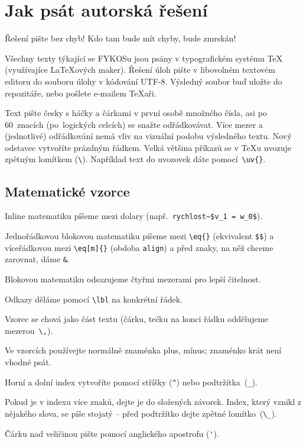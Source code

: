 \documentclass[fykos]{fksbase} %
\begin{document}
\section{Jak psát autorská řešení}

Řešení pište bez chyb! Kdo tam bude mít chyby, bude zmrskán!

Všechny texty týkající se FYKOSu jsou psány v typografickém systému \TeX
(využívajíce {\LaTeX}ových maker). Řešení úloh pište v libovolném
textovém editoru do souboru úlohy v kódování UTF-8. Výsledný soubor buď uložte
do repozitáře, nebo pošlete e-mailem TeXaři.

Text pište česky s háčky a čárkami v první osobě množného čísla, asi po 60~znacích
(po~logických celcích) se snažte odřádkovávat. Více mezer a (jednotlivé) odřádkování
nemá vliv na vizuální podobu výsledného textu. Nový odstavec vytvoříte prázdným
řádkem. Velká většina příkazů
se v TeXu uvozuje zpětným lomítkem (\verb|\|). Například text do uvozovek dáte
pomocí~\verb|\uv{}|.

\subsection{Matematické vzorce}
\begin{compactitem}
    \item Inline matematiku píšeme mezi dolary (např.~\verb|rychlost~$v_1 = w_0$|).
    \item Jednořádkovou blokovou matematiku píšeme mezi \verb|\eq{}| (ekvivalent \verb|$$|)
    a víceřádkovou mezi \verb|\eq[m]{}| (obdoba \verb|align|) a před znaky, na něž chceme
    zarovnat, dáme \verb|&|.
    \item Blokovou matematiku odsazujeme čtyřmi mezerami pro lepší čitelnost.
    \item Odkazy děláme pomocí \verb|\lbl| na konkrétní řádek.
    \item Vzorec se chová jako část textu (čárku, tečku na konci řádku oddělujeme mezerou~\verb|\,|).
    \item Ve vzorcích používejte normálně znaménka plus, mínus; znaménko krát není vhodné psát.
    \item Horní a dolní index vytvoříte pomocí stříšky (\verb|^|) nebo podtržítka~(\verb|_|).
    \item Pokud je v indexu více znaků, dejte je do složených závorek. Index, který
    vznikl z nějakého slova, se píše stojatý – před podtržítko dejte zpětné lomítko~(\verb|\_|).
    \item Čárku nad veličinou pište pomocí anglického apostrofu (\verb|'|).
\end{compactitem}
\end{document}

